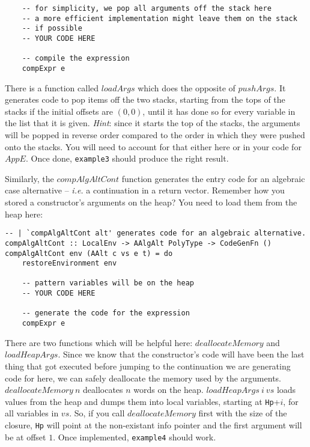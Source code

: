 \documentclass[10pt,a4paper]{exam} %
\begin{document}
\begin{questions}
\begin{verbatim}
    -- for simplicity, we pop all arguments off the stack here
    -- a more efficient implementation might leave them on the stack
    -- if possible
    -- YOUR CODE HERE

    -- compile the expression
    compExpr e
\end{verbatim}
There is a function called $\mathit{loadArgs}$ which does the opposite of $\mathit{pushArgs}$. It generates code to pop items off the two stacks, starting from the tops of the stacks if the initial offsets are $(0,0)$, until it has done so for every variable in the list that it is given. \emph{Hint}: since it starts the top of the stacks, the arguments will be popped in reverse order compared to the order in which they were pushed onto the stacks. You will need to account for that either here or in your code for $\mathit{AppE}$. Once done, \texttt{example3} should produce the right result.

\question Similarly, the $\mathit{compAlgAltCont}$ function generates the entry code for an algebraic case alternative -- \emph{i.e.} a continuation in a return vector. Remember how you stored a constructor's arguments on the heap? You need to load them from the heap here:
\begin{verbatim}
-- | `compAlgAltCont alt' generates code for an algebraic alternative.
compAlgAltCont :: LocalEnv -> AAlgAlt PolyType -> CodeGenFn ()
compAlgAltCont env (AAlt c vs e t) = do
    restoreEnvironment env

    -- pattern variables will be on the heap
    -- YOUR CODE HERE

    -- generate the code for the expression
    compExpr e
\end{verbatim}
There are two functions which will be helpful here: $\mathit{deallocateMemory}$ and $\mathit{loadHeapArgs}$. Since we know that the constructor's code will have been the last thing that got executed before jumping to the continuation we are generating code for here, we can safely deallocate the memory used by the arguments. $\mathit{deallocateMemory}~n$ deallocates $n$ words on the heap. $\mathit{loadHeapArgs}~i~\mathit{vs}$ loads values from the heap and dumps them into local variables, starting at \texttt{Hp}+$i$, for all variables in $\mathit{vs}$. So, if you call $\mathit{deallocateMemory}$ first with the size of the closure, \texttt{Hp} will point at the non-existant info pointer and the first argument will be at offset $1$. Once implemented, \texttt{example4} should work.


\end{questions}
\end{document}
